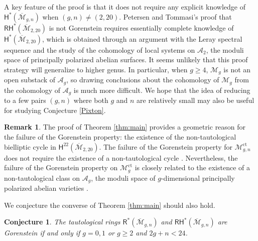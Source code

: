\documentclass[12pt]{amsart}
\newtheorem{conj}[thm]{Conjecture}
\theoremstyle{definition}
\newtheorem{rem}[thm]{Remark}
\renewcommand{\H}{\mathsf{H}}
\newcommand{\R}{\mathsf{R}}
\newcommand{\RH}{\mathsf{RH}}
\newcommand{\M}{\mathcal{M}}
\DeclareMathOperator{\ct}{ct}
\newcommand{\Mb}{\overline{\M}}
\begin{document}
A key feature of the proof is that it does not require any explicit knowledge of $\H^*(\Mb_{g,n})$ when $(g,n)\neq (2,20)$. Petersen and Tommasi's proof \cite{PetersenTommasi} that $\RH^*(\Mb_{2,20})$ is not Gorenstein requires essentially complete knowledge of $\H^*(\Mb_{2,20})$, which is obtained through an argument with the Leray spectral sequence and the study of the cohomology of local systems on $\mathcal{A}_2$, the moduli space of principally polarized abelian surfaces. It seems unlikely that this proof strategy will generalize to higher genus. In particular, when $g\geq 4$, $\M_g$ is not an open substack of $\mathcal{A}_g$, so drawing conclusions about the cohomology of $\M_g$ from the cohomology of $\mathcal{A}_g$ is much more difficult. We hope that the idea of reducing to a few pairs $(g,n)$ where both $g$ and $n$ are relatively small may also be useful for studying Conjecture \ref{Pixton}.

\begin{rem}
    The proof of Theorem \ref{thm:main} provides a geometric reason for the failure of the Gorenstein property: the existence of the non-tautological bielliptic cycle in $\H^{22}(\Mb_{2,20})$. The failure of the Gorenstein property for $\M_{g,n}^{\ct}$ does not require the existence of a non-tautological cycle \cite{CLSGorenstein}. Nevertheless, the failure of the Gorenstein property on $\M_g^{\ct}$ is closely related to the existence of a non-tautological class on $\mathcal{A}_g$, the moduli space of $g$-dimensional principally polarized abelian varieties \cite{COPabelian}.
\end{rem}



We conjecture the converse of Theorem \ref{thm:main} should also hold.
\begin{conj}\label{conj:alwaysgorensteinotherwise}
    The tautological rings $\R^*(\Mb_{g,n})$ and $\RH^*(\Mb_{g,n})$ are Gorenstein if and only if $g=0,1$ or $g\geq 2$ and $2g+n<24$.
\end{conj}
\end{document}
